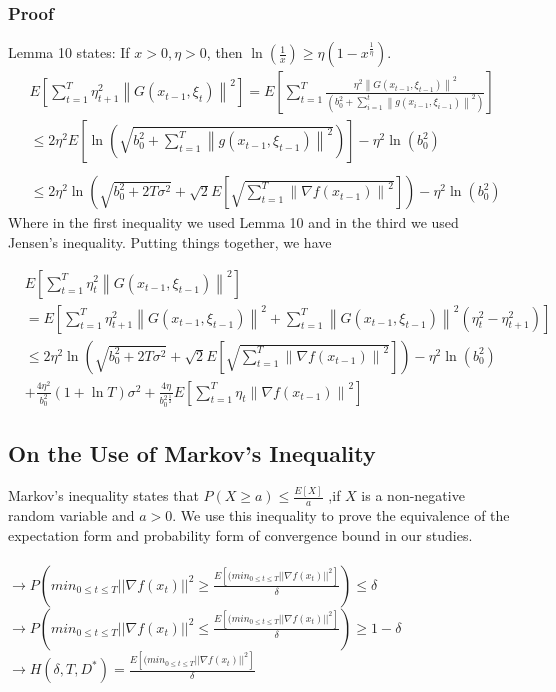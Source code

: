 \documentclass[14pt,onecolumn,letterpaper]{extarticle}
\begin{document}
\subsubsection{Proof}
Lemma 10 states: If $x>0, \eta>0$, then $\ln (\frac{1}{x}) \geq \eta\left(1-x^{\frac{1}{\eta}}\right)$.
$$
\begin{aligned}
& {E}\left[\sum_{t=1}^T \eta_{t+1}^2\left\|{G}\left({x}_{t-1}, \xi_t\right)\right\|^2\right]={E}\left[\sum_{t=1}^T \frac{\eta^2\left\|{G}\left({x}_{t-1}, \xi_{t-1}\right)\right\|^2}{\left(b_0^2 +\sum_{i=1}^t\left\|{g}\left({x}_{i-1}, \xi_{i-1}\right)\right\|^2\right)}\right] \\
& \leq 2 \eta^2 {E}\left[\ln \left(\sqrt{b_0^2 +\sum_{t=1}^T\left\|{g}\left({x}_{t-1}, \xi_{t-1}\right)\right\|^2}\right)\right]-\eta^2 \ln \left(b_0^2\right)\\
& \\
& \leq 2 \eta^2 \ln \left(\sqrt{b_0^2 +2 T \sigma^2}+\sqrt{2} {E}\left[\sqrt{\sum_{t=1}^T\left\|\nabla f\left({x}_{t-1}\right)\right\|^2}\right]\right)-\eta^2 \ln \left(b_0^2\right)
\end{aligned}
$$
Where in the first inequality we used Lemma 10 and in the third we used Jensen's inequality.
Putting things together, we have\par
\begin{align*}
& {E}\left[\sum_{t=1}^T \eta_t^2\left\|{G}\left({x}_{t-1}, \xi_{t-1}\right)\right\|^2\right]\\&={E}\left[\sum_{t=1}^T \eta_{t+1}^2\left\|{G}\left({x}_{t-1}, \xi_{t-1}\right)\right\|^2+\sum_{t=1}^T\left\|{G}\left({x}_{t-1}, \xi_{t-1}\right)\right\|^2\left(\eta_t^2-\eta_{t+1}^2\right)\right] \\
& \leq 2 \eta^2 \ln \left(\sqrt{b_0^2 +2 T \sigma^2}+\sqrt{2} {E}\left[\sqrt{\sum_{t=1}^T\left\|\nabla f\left({x}_{t-1}\right)\right\|^2}\right]\right)-\eta^2 \ln \left(b_0^2\right)
\\&+\frac{4 \eta^2}{b_0^2 }(1+\ln T) \sigma^2+\frac{4 \eta}{b_0^2 ^{\frac{1}{2}}} {E}\left[\sum_{t=1}^T \eta_t\left\|\nabla f\left({x}_{t-1}\right)\right\|^2\right]
\end{align*}

\subsection{On the Use of Markov's Inequality}
Markov's inequality states that $P(X\geq a)\leq \frac{E[X]}{a}$ ,if $X$ is a non-negative random variable and $a > 0$. We use this inequality to prove the equivalence of the expectation form and probability form of convergence bound in our studies.\\\\
    $\rightarrow P(min_{0\leq t \leq T} ||\nabla f(x_t)||^2 \geq \frac{E[(min_{0\leq t \leq T} ||\nabla f(x_t)||^2]}{\delta}) \leq \delta$\\
    $\rightarrow P(min_{0\leq t \leq T} ||\nabla f(x_t)||^2 \leq \frac{E[(min_{0\leq t \leq T} ||\nabla f(x_t)||^2]}{\delta}) \geq 1-\delta$\\
    $\rightarrow H(\delta, T, D^*)=\frac{E[(min_{0\leq t \leq T} ||\nabla f(x_t)||^2]}{\delta}$
\end{document}
